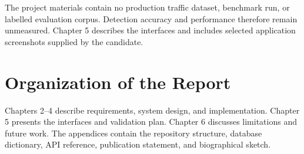 The project materials contain no production traffic dataset, benchmark run, or labelled evaluation corpus. Detection accuracy and performance therefore remain unmeasured. Chapter 5 describes the interfaces and includes selected application screenshots supplied by the candidate.

\section{Organization of the Report}
Chapters 2--4 describe requirements, system design, and implementation. Chapter 5 presents the interfaces and validation plan. Chapter 6 discusses limitations and future work. The appendices contain the repository structure, database dictionary, API reference, publication statement, and biographical sketch.

